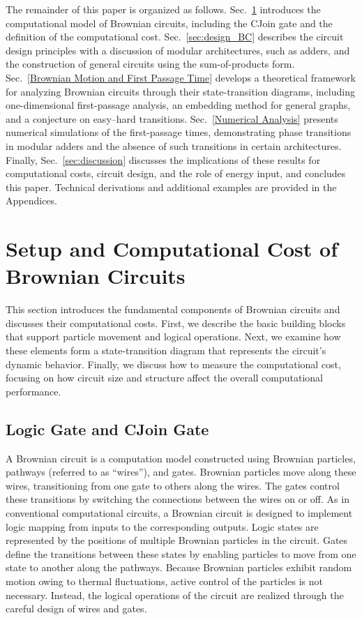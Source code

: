\documentclass[%
 reprint,
superscriptaddress,
 amsmath,amssymb,
 aps,
 prx,
]{revtex4-2}
\begin{document}
The remainder of this paper is organized as follows. 
Sec.~\ref{sec:setup} introduces the computational model of Brownian circuits, including the CJoin gate and the definition of the computational cost. Sec.~\ref {sec:design_BC} describes the circuit design principles with a discussion of modular architectures, such as adders, and the construction of general circuits using the sum-of-products form. 
Sec.~\ref{Brownian Motion and First Passage Time} develops a theoretical framework for analyzing Brownian circuits through their state-transition diagrams, including one-dimensional first-passage analysis, an embedding method for general graphs, and a conjecture on easy--hard transitions. Sec.~\ref {Numerical Analysis} presents numerical simulations of the first-passage times, demonstrating phase transitions in modular adders and the absence of such transitions in certain architectures. Finally, Sec.~\ref {sec:discussion} discusses the implications of these results for computational costs, circuit design, and the role of energy input, and concludes this paper. Technical derivations and additional examples are provided in the Appendices. 

\section{Setup and Computational Cost of Brownian Circuits}
\label{sec:setup}
This section introduces the fundamental components of Brownian circuits and discusses their computational costs. First, we describe the basic building blocks that support particle movement and logical operations. Next, we examine how these elements form a state-transition diagram that represents the circuit's dynamic behavior. Finally, we discuss how to measure the computational cost, focusing on how circuit size and structure affect the overall computational performance. 

\subsection{Logic Gate and CJoin Gate}\label{Logic Gate and CJoin Gate}
A Brownian circuit \cite{bennett_thermodynamics_1982, peper_brownian_2013} is a computation model constructed using Brownian particles, pathways (referred to as ``wires''), and gates. Brownian particles move along these wires, transitioning from one gate to others along the wires. The gates control these transitions by switching the connections between the wires on or off. 
As in conventional computational circuits, a Brownian circuit is designed to implement logic mapping from inputs to the corresponding outputs. Logic states are represented by the positions of multiple Brownian particles in the circuit. Gates define the transitions between these states by enabling particles to move from one state to another along the pathways. 
Because Brownian particles exhibit random motion owing to thermal fluctuations, active control of the particles is not necessary. Instead, the logical operations of the circuit are realized through the careful design of wires and gates.
\end{document}
